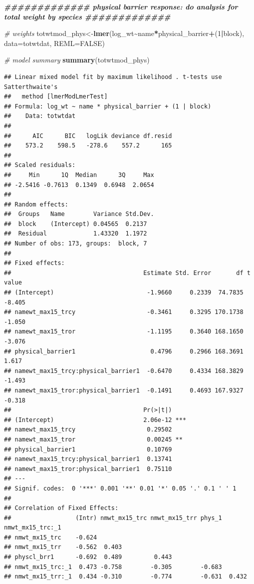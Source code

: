 \documentclass[
]{article}
\newenvironment{Shaded}{\begin{snugshade}}{\end{snugshade}}
\newcommand{\AttributeTok}[1]{\textcolor[rgb]{0.13,0.29,0.53}{#1}}
\newcommand{\CommentTok}[1]{\textcolor[rgb]{0.56,0.35,0.01}{\textit{#1}}}
\newcommand{\ConstantTok}[1]{\textcolor[rgb]{0.56,0.35,0.01}{#1}}
\newcommand{\DecValTok}[1]{\textcolor[rgb]{0.00,0.00,0.81}{#1}}
\newcommand{\DocumentationTok}[1]{\textcolor[rgb]{0.56,0.35,0.01}{\textbf{\textit{#1}}}}
\newcommand{\FunctionTok}[1]{\textcolor[rgb]{0.13,0.29,0.53}{\textbf{#1}}}
\newcommand{\NormalTok}[1]{#1}
\newcommand{\OtherTok}[1]{\textcolor[rgb]{0.56,0.35,0.01}{#1}}
\newcommand{\SpecialCharTok}[1]{\textcolor[rgb]{0.81,0.36,0.00}{\textbf{#1}}}
\begin{document}
\begin{Shaded}
\begin{Highlighting}[]
\DocumentationTok{\#\#\#\#\#\#\#\#\#\#\#\#\# physical barrier response: do analysis for total weight by species \#\#\#\#\#\#\#\#\#\#\#\#\# }

\CommentTok{\# weights}
\NormalTok{totwtmod\_phys}\OtherTok{\textless{}{-}}\FunctionTok{lmer}\NormalTok{(log\_wt}\SpecialCharTok{\textasciitilde{}}\NormalTok{name}\SpecialCharTok{*}\NormalTok{physical\_barrier}\SpecialCharTok{+}\NormalTok{(}\DecValTok{1}\SpecialCharTok{|}\NormalTok{block), }\AttributeTok{data=}\NormalTok{totwtdat, }\AttributeTok{REML=}\ConstantTok{FALSE}\NormalTok{)}

\CommentTok{\# model summary}
\FunctionTok{summary}\NormalTok{(totwtmod\_phys)}
\end{Highlighting}
\end{Shaded}

\begin{verbatim}
## Linear mixed model fit by maximum likelihood . t-tests use Satterthwaite's
##   method [lmerModLmerTest]
## Formula: log_wt ~ name * physical_barrier + (1 | block)
##    Data: totwtdat
## 
##      AIC      BIC   logLik deviance df.resid 
##    573.2    598.5   -278.6    557.2      165 
## 
## Scaled residuals: 
##     Min      1Q  Median      3Q     Max 
## -2.5416 -0.7613  0.1349  0.6948  2.0654 
## 
## Random effects:
##  Groups   Name        Variance Std.Dev.
##  block    (Intercept) 0.04565  0.2137  
##  Residual             1.43320  1.1972  
## Number of obs: 173, groups:  block, 7
## 
## Fixed effects:
##                                     Estimate Std. Error       df t value
## (Intercept)                          -1.9660     0.2339  74.7835  -8.405
## namewt_max15_trcy                    -0.3461     0.3295 170.1738  -1.050
## namewt_max15_tror                    -1.1195     0.3640 168.1650  -3.076
## physical_barrier1                     0.4796     0.2966 168.3691   1.617
## namewt_max15_trcy:physical_barrier1  -0.6470     0.4334 168.3829  -1.493
## namewt_max15_tror:physical_barrier1  -0.1491     0.4693 167.9327  -0.318
##                                     Pr(>|t|)    
## (Intercept)                         2.06e-12 ***
## namewt_max15_trcy                    0.29502    
## namewt_max15_tror                    0.00245 ** 
## physical_barrier1                    0.10769    
## namewt_max15_trcy:physical_barrier1  0.13741    
## namewt_max15_tror:physical_barrier1  0.75110    
## ---
## Signif. codes:  0 '***' 0.001 '**' 0.01 '*' 0.05 '.' 0.1 ' ' 1
## 
## Correlation of Fixed Effects:
##                  (Intr) nmwt_mx15_trc nmwt_mx15_trr phys_1 nmwt_mx15_trc:_1
## nmwt_mx15_trc    -0.624                                                    
## nmwt_mx15_trr    -0.562  0.403                                             
## physcl_brr1      -0.692  0.489         0.443                               
## nmwt_mx15_trc:_1  0.473 -0.758        -0.305        -0.683                 
## nmwt_mx15_trr:_1  0.434 -0.310        -0.774        -0.631  0.432
\end{verbatim}
\end{document}
